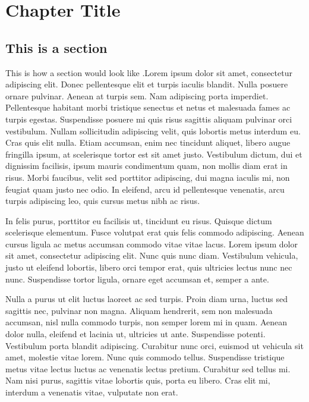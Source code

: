 \chapter{Chapter Title}
\label{chap:Chapter3}

\section{This is a section}

This is how a section would look like .Lorem ipsum dolor sit amet, consectetur adipiscing elit. Donec pellentesque elit et turpis iaculis blandit. Nulla posuere ornare pulvinar. Aenean at turpis sem. Nam adipiscing porta imperdiet. Pellentesque habitant morbi tristique senectus et netus et malesuada fames ac turpis egestas. Suspendisse posuere mi quis risus sagittis aliquam pulvinar orci vestibulum. Nullam sollicitudin adipiscing velit, quis lobortis metus interdum eu. Cras quis elit nulla. Etiam accumsan, enim nec tincidunt aliquet, libero augue fringilla ipsum, at scelerisque tortor est sit amet justo. Vestibulum dictum, dui et dignissim facilisis, ipsum mauris condimentum quam, non mollis diam erat in risus. Morbi faucibus, velit sed porttitor adipiscing, dui magna iaculis mi, non feugiat quam justo nec odio. In eleifend, arcu id pellentesque venenatis, arcu turpis adipiscing leo, quis cursus metus nibh ac risus.

In felis purus, porttitor eu facilisis ut, tincidunt eu risus. Quisque dictum scelerisque elementum. Fusce volutpat erat quis felis commodo adipiscing. Aenean cursus ligula ac metus accumsan commodo vitae vitae lacus. Lorem ipsum dolor sit amet, consectetur adipiscing elit. Nunc quis nunc diam. Vestibulum vehicula, justo ut eleifend lobortis, libero orci tempor erat, quis ultricies lectus nunc nec nunc. Suspendisse tortor ligula, ornare eget accumsan et, semper a ante.

Nulla a purus ut elit luctus laoreet ac sed turpis. Proin diam urna, luctus sed sagittis nec, pulvinar non magna. Aliquam hendrerit, sem non malesuada accumsan, nisl nulla commodo turpis, non semper lorem mi in quam. Aenean dolor nulla, eleifend et lacinia ut, ultricies ut ante. Suspendisse potenti. Vestibulum porta blandit adipiscing. Curabitur nunc orci, euismod ut vehicula sit amet, molestie vitae lorem. Nunc quis commodo tellus. Suspendisse tristique metus vitae lectus luctus ac venenatis lectus pretium. Curabitur sed tellus mi. Nam nisi purus, sagittis vitae lobortis quis, porta eu libero. Cras elit mi, interdum a venenatis vitae, vulputate non erat.



